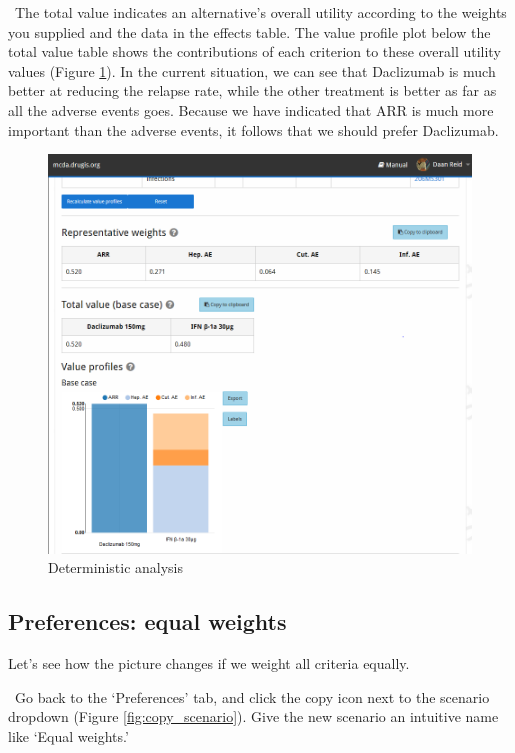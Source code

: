 \documentclass[00_mcda_tutorial.tex]{subfiles}
\begin{document}
\noindent \faGraduationCap \, The total value indicates an alternative’s overall utility according to the weights you supplied and the data in the effects table. The value profile plot below the total value table shows the contributions of each criterion to these overall utility values (Figure \ref{fig:deterministic_ranked}). In the current situation, we can see that Daclizumab is much better at reducing the relapse rate, while the other treatment is better as far as all the adverse events goes. Because we have indicated that ARR is much more important than the adverse events, it follows that we should prefer Daclizumab.

\begin{figure}[!h]
    \centering
	\includegraphics[width=\textwidth]{fig/deterministicRanked.png}
    \caption{Deterministic analysis}
	\label{fig:deterministic_ranked}
\end{figure}

\subsection*{Preferences: equal weights}
Let’s see how the picture changes if we weight all criteria equally.
\newline

\noindent \leftpointright \, Go back to the ‘Preferences’ tab, and click the copy icon next to the scenario dropdown (Figure \ref{fig:copy_scenario}). Give the new scenario an intuitive name like ‘Equal weights.’
\newline
\end{document}
